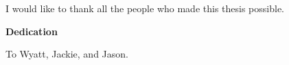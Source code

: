 I would like to thank all the people who made this thesis possible.
\cleardoublepage
{}    %

\begin{center}\textbf{Dedication}\end{center}

\begin{center}
To Wyatt, Jackie, and Jason.    
\end{center}

\cleardoublepage
{}    %

\renewcommand\contentsname{Table of Contents}
\tableofcontents
\cleardoublepage
{}    %

{\renewcommand{\addvspace}[1]{} \listoffigures}
\cleardoublepage
{}		%

{\renewcommand{\addvspace}[1]{} \listoftables}
\cleardoublepage
{}		%

\renewcommand*{\abbreviationsname}{List of Abbreviations}
\printglossary[type=abbreviations]
\cleardoublepage
{}		%

\printglossary[type=symbols]
\cleardoublepage
{}		%



